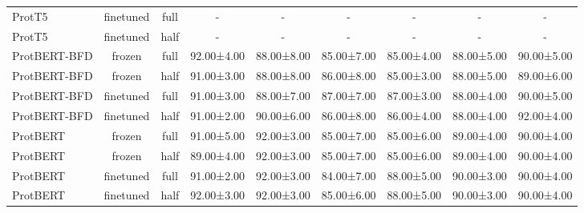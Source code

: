 \begin{tabular}{lcccccccc}
      ProtT5 &      finetuned &      full &           - &          - &          - &          - &          - &          - \\
      ProtT5 &      finetuned &      half &           - &          - &          - &          - &          - &          - \\
ProtBERT-BFD &         frozen &      full &  92.00±4.00 & 88.00±8.00 & 85.00±7.00 & 85.00±4.00 & 88.00±5.00 & 90.00±5.00 \\
ProtBERT-BFD &         frozen &      half &  91.00±3.00 & 88.00±8.00 & 86.00±8.00 & 85.00±3.00 & 88.00±5.00 & 89.00±6.00 \\
ProtBERT-BFD &      finetuned &      full &  91.00±3.00 & 88.00±7.00 & 87.00±7.00 & 87.00±3.00 & 88.00±4.00 & 90.00±5.00 \\
ProtBERT-BFD &      finetuned &      half &  91.00±2.00 & 90.00±6.00 & 86.00±8.00 & 86.00±4.00 & 88.00±4.00 & 92.00±4.00 \\
    ProtBERT &         frozen &      full &  91.00±5.00 & 92.00±3.00 & 85.00±7.00 & 85.00±6.00 & 89.00±4.00 & 90.00±4.00 \\
    ProtBERT &         frozen &      half &  89.00±4.00 & 92.00±3.00 & 85.00±7.00 & 85.00±6.00 & 89.00±4.00 & 90.00±4.00 \\
    ProtBERT &      finetuned &      full &  91.00±2.00 & 92.00±3.00 & 84.00±7.00 & 88.00±5.00 & 90.00±3.00 & 90.00±4.00 \\
    ProtBERT &      finetuned &      half &  92.00±3.00 & 92.00±3.00 & 85.00±6.00 & 88.00±5.00 & 90.00±3.00 & 90.00±4.00 \\
\bottomrule
\end{tabular}
